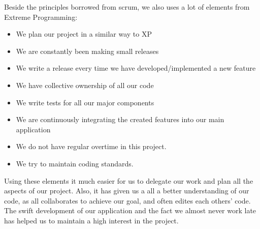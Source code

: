 Beside the principles borrowed from scrum, we also uses a lot of elements from Extreme Programming:
\begin{itemize}
\item We plan our project in a similar way to XP
\item We are constantly been making small releases 
\item We write a release every time we have developed/implemented a new feature
\item We have collective ownership of all our code
\item We write tests for all our major components 
\item We are continuously integrating the created features into our main application
\item We do not have regular overtime in this project.
\item We try to maintain coding standards.
\end{itemize}
Using these elements it much easier for us to delegate our work and plan all the aspects of our project. Also, it has given us a all a better understanding of our code, as all collaborates to achieve our goal, and often edites each others' code. The swift development of our application and the fact we almost never work late has helped us to maintain a high interest in the project.